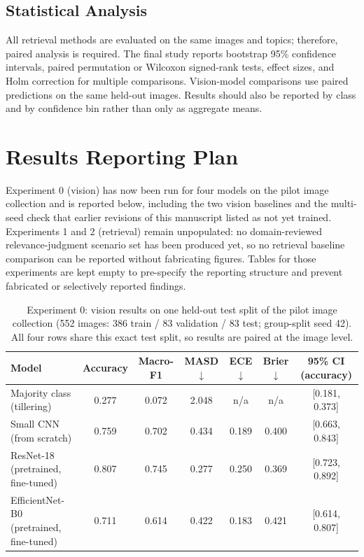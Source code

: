 \documentclass[conference]{IEEEtran}
\begin{document}
\subsection{Statistical Analysis}
All retrieval methods are evaluated on the same images and topics; therefore, paired analysis is required. The final study reports bootstrap 95\% confidence intervals, paired permutation or Wilcoxon signed-rank tests, effect sizes, and Holm correction for multiple comparisons. Vision-model comparisons use paired predictions on the same held-out images. Results should also be reported by class and by confidence bin rather than only as aggregate means.

\section{Results Reporting Plan}
Experiment 0 (vision) has now been run for four models on the pilot image collection and is reported below, including the two vision baselines and the multi-seed check that earlier revisions of this manuscript listed as not yet trained. Experiments 1 and 2 (retrieval) remain unpopulated: no domain-reviewed relevance-judgment scenario set has been produced yet, so no retrieval baseline comparison can be reported without fabricating figures. Tables for those experiments are kept empty to pre-specify the reporting structure and prevent fabricated or selectively reported findings.

\begin{table}[t]
\caption{Experiment 0: vision results on one held-out test split of the pilot image collection (552 images: 386 train / 83 validation / 83 test; group-split seed 42). All four rows share this exact test split, so results are paired at the image level.}
\label{tab:vision-results}
\centering
\footnotesize
\begin{tabular}{lcccccc}
\toprule
Model & Accuracy & Macro-F1 & MASD $\downarrow$ & ECE $\downarrow$ & Brier $\downarrow$ & 95\% CI (accuracy) \\
\midrule
Majority class (tillering) & 0.277 & 0.072 & 2.048 & n/a & n/a & [0.181, 0.373] \\
Small CNN (from scratch) & 0.759 & 0.702 & 0.434 & 0.189 & 0.400 & [0.663, 0.843] \\
ResNet-18 (pretrained, fine-tuned) & 0.807 & 0.745 & 0.277 & 0.250 & 0.369 & [0.723, 0.892] \\
EfficientNet-B0 (pretrained, fine-tuned) & 0.711 & 0.614 & 0.422 & 0.183 & 0.421 & [0.614, 0.807] \\
\bottomrule
\end{tabular}
\end{table}
\end{document}
